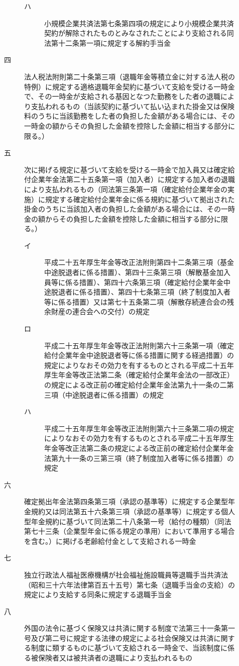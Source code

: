 \documentclass[twocolumn,a4j,10pt]{ltjtarticle}
\begin{document}
\begin{description}
\begin{description}
\begin{description}
\item[ハ]小規模企業共済法第七条第四項の規定により小規模企業共済契約が解除されたものとみなされたことにより支給される同法第十二条第一項に規定する解約手当金
\end{description}
\item[四]法人税法附則第二十条第三項（退職年金等積立金に対する法人税の特例）に規定する適格退職年金契約に基づいて支給を受ける一時金で、その一時金が支給される基因となつた勤務をした者の退職により支払われるもの（当該契約に基づいて払い込まれた掛金又は保険料のうちに当該勤務をした者の負担した金額がある場合には、その一時金の額からその負担した金額を控除した金額に相当する部分に限る。）
\item[五]次に掲げる規定に基づいて支給を受ける一時金で加入員又は確定給付企業年金法第二十五条第一項（加入者）に規定する加入者の退職により支払われるもの（同法第三条第一項（確定給付企業年金の実施）に規定する確定給付企業年金に係る規約に基づいて拠出された掛金のうちに当該加入者の負担した金額がある場合には、その一時金の額からその負担した金額を控除した金額に相当する部分に限る。）
\begin{description}
\item[イ]平成二十五年厚生年金等改正法附則第四十二条第三項（基金中途脱退者に係る措置）、第四十三条第三項（解散基金加入員等に係る措置）、第四十六条第三項（確定給付企業年金中途脱退者に係る措置）、第四十七条第三項（終了制度加入者等に係る措置）又は第七十五条第二項（解散存続連合会の残余財産の連合会への交付）の規定
\item[ロ]平成二十五年厚生年金等改正法附則第六十三条第一項（確定給付企業年金中途脱退者等に係る措置に関する経過措置）の規定によりなおその効力を有するものとされる平成二十五年厚生年金等改正法第二条（確定給付企業年金法の一部改正）の規定による改正前の確定給付企業年金法第九十一条の二第三項（中途脱退者に係る措置）の規定
\item[ハ]平成二十五年厚生年金等改正法附則第六十三条第二項の規定によりなおその効力を有するものとされる平成二十五年厚生年金等改正法第二条の規定による改正前の確定給付企業年金法第九十一条の三第三項（終了制度加入者等に係る措置）の規定
\end{description}
\item[六]確定拠出年金法第四条第三項（承認の基準等）に規定する企業型年金規約又は同法第五十六条第三項（承認の基準等）に規定する個人型年金規約に基づいて同法第二十八条第一号（給付の種類）（同法第七十三条（企業型年金に係る規定の準用）において準用する場合を含む。）に掲げる老齢給付金として支給される一時金
\item[七]独立行政法人福祉医療機構が社会福祉施設職員等退職手当共済法（昭和三十六年法律第百五十五号）第七条（退職手当金の支給）の規定により支給する同条に規定する退職手当金
\item[八]外国の法令に基づく保険又は共済に関する制度で法第三十一条第一号及び第二号に規定する法律の規定による社会保険又は共済に関する制度に類するものに基づいて支給される一時金で、当該制度に係る被保険者又は被共済者の退職により支払われるもの
\end{description}
\end{description}
\end{document}
